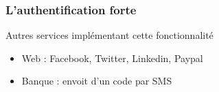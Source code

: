 \documentclass{beamer}
\begin{document}
\begin{frame}
\frametitle{L'authentification forte}
\begin{block}{Autres services implémentant cette fonctionnalité}
\begin{itemize}
\item Web : Facebook, Twitter, Linkedin, Paypal
\item Banque : envoit d'un code par SMS
\end{itemize}
\end{block}
\end{frame}
\end{document}
